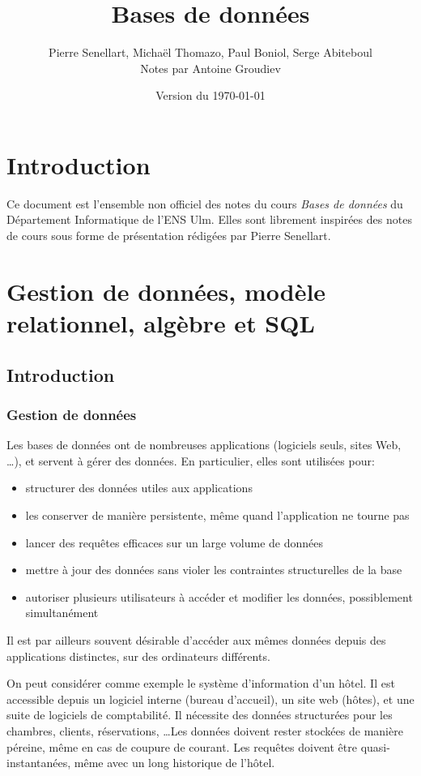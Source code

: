 \documentclass[french, toc]{../cs-classes/cs-classes}
\title{Bases de données}
\author{Pierre Senellart, Michaël Thomazo, Paul Boniol, Serge Abiteboul\\ Notes par Antoine Groudiev}
\date{Version du \today}
\begin{document}
\section*{Introduction}
Ce document est l'ensemble non officiel des notes du cours \emph{Bases de données} du Département Informatique de l'ENS Ulm. Elles sont librement inspirées des notes de cours sous forme de présentation rédigées par Pierre Senellart.

\section{Gestion de données, modèle relationnel, algèbre et SQL}
\subsection{Introduction} 
\subsubsection{Gestion de données}
Les bases de données ont de nombreuses applications (logiciels seuls, sites Web, \dots), et servent à gérer des données. En particulier, elles sont utilisées pour:
\begin{itemize}
    \item structurer des données utiles aux applications
    \item les conserver de manière persistente, même quand l'application ne tourne pas
    \item lancer des requêtes efficaces sur un large volume de données
    \item mettre à jour des données sans violer les contraintes structurelles de la base
    \item autoriser plusieurs utilisateurs à accéder et modifier les données, possiblement simultanément
\end{itemize}
Il est par ailleurs souvent désirable d'accéder aux mêmes données depuis des applications distinctes, sur des ordinateurs différents.

On peut considérer comme exemple le système d'information d'un hôtel. Il est accessible depuis un logiciel interne (bureau d'accueil), un site web (hôtes), et une suite de logiciels de comptabilité. Il nécessite des données structurées pour les chambres, clients, réservations, \dots Les données doivent rester stockées de manière péreine, même en cas de coupure de courant. Les requêtes doivent être quasi-instantanées, même avec un long historique de l'hôtel.
\end{document}

